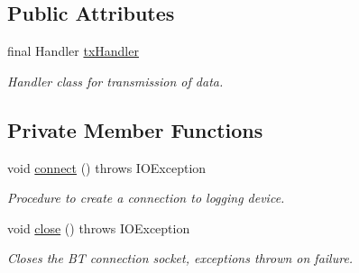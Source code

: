 \subsection*{Public Attributes}
\begin{DoxyCompactItemize}
\item 
final Handler \hyperlink{classcom_1_1jack_1_1motorbikestatistics_1_1_b_t_connection_a7a88b2007af6a9a5c8667a9f1df980cc}{tx\+Handler}
\begin{DoxyCompactList}\small\item\em Handler class for transmission of data. \end{DoxyCompactList}\end{DoxyCompactItemize}
\subsection*{Private Member Functions}
\begin{DoxyCompactItemize}
\item 
void \hyperlink{classcom_1_1jack_1_1motorbikestatistics_1_1_b_t_connection_a4c1b8ebff8a40a9cddd77a55b59b45af}{connect} ()  throws I\+O\+Exception 
\begin{DoxyCompactList}\small\item\em Procedure to create a connection to logging device. \end{DoxyCompactList}\item 
\mbox{\label{classcom_1_1jack_1_1motorbikestatistics_1_1_b_t_connection_ac1cd0e85a758db424a57010ac9bb87f0}} 
void \hyperlink{classcom_1_1jack_1_1motorbikestatistics_1_1_b_t_connection_ac1cd0e85a758db424a57010ac9bb87f0}{close} ()  throws I\+O\+Exception 
\begin{DoxyCompactList}\small\item\em Closes the BT connection socket, exceptions thrown on failure. \end{DoxyCompactList}\end{DoxyCompactItemize}

